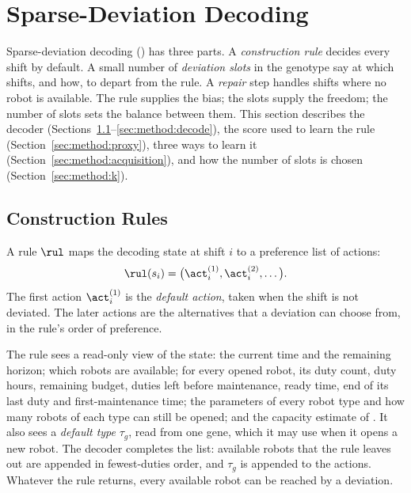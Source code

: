 \section{Sparse-Deviation Decoding}
\label{sec:method}


Sparse-deviation decoding (\SDD) has three parts.
A \emph{construction rule} decides every shift by default.
A small number of \emph{deviation slots} in the genotype say at which shifts, and how, to depart from the rule.
A \emph{repair} step handles shifts where no robot is available.
The rule supplies the bias; the slots supply the freedom; the number of slots sets the balance between them.
This section describes the decoder (Sections~\ref{sec:method:rule}--\ref{sec:method:decode}),
the score used to learn the rule (Section~\ref{sec:method:proxy}),
three ways to learn it (Section~\ref{sec:method:acquisition}),
and how the number of slots is chosen (Section~\ref{sec:method:k}).

\subsection{Construction Rules}
\label{sec:method:rule}

A rule $\rul$ maps the decoding state at shift $i$ to a preference list of actions:
\begin{equation}
  \rul(s_i) = \bigl(\act_i^{(1)}, \act_i^{(2)}, \dots\bigr).
\end{equation}
The first action $\act_i^{(1)}$ is the \emph{default action}, taken when the shift is not deviated.
The later \reuse actions are the alternatives that a deviation can choose from, in the rule's order of preference.

The rule sees a read-only view of the state:
the current time and the remaining horizon;
which robots are available;
for every opened robot, its duty count, duty hours, remaining budget, duties left before maintenance, ready time, end of its last duty and first-maintenance time;
the parameters of every robot type and how many robots of each type can still be opened;
and the capacity estimate of .
It also sees a \emph{default type} $\tau_g$, read from one gene, which it may use when it opens a new robot.
The decoder completes the list: available robots that the rule leaves out are appended in fewest-duties order, and $\tau_g$ is appended to the \new actions.
Whatever the rule returns, every available robot can be reached by a deviation.

